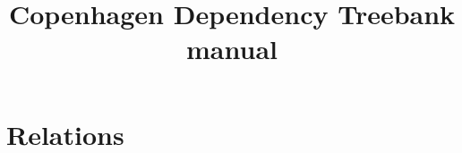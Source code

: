 \documentclass{report}
\begin{document}
	\title{Copenhagen Dependency Treebank manual}

	\chapter{Relations}

	
\end{document}
